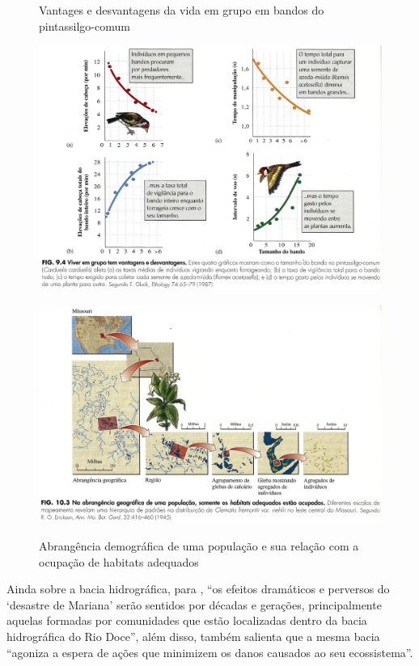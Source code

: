 \documentclass[
article,			%
11pt,				%
oneside,			%
a4paper,			%
english,			%
brazil,				%
sumario=tradicional
]{abntex2}
\begin{document}
	\begin{figure}
		\centering
		\caption{Vantages e desvantagens da vida em grupo em bandos do pintassilgo-comum}
		\includegraphics[width=1.0\linewidth]{img/rick_180_01.png}
		\label{fig:grupos}
		
		\caption{Abrangência demográfica de uma população e sua relação com a ocupação de habitats adequados}
		\includegraphics[width=1.0\linewidth]{img/rick_194_01.png}
		\label{fig:habitats}
	\end{figure}
	
	Ainda sobre a bacia hidrográfica, para , ``os efeitos dramáticos e perversos do `desastre de Mariana' serão sentidos por décadas e gerações, principalmente aquelas formadas por comunidades que estão localizadas dentro da bacia hidrográfica do Rio Doce'', além disso,  também salienta que a mesma bacia ``agoniza a espera de ações que minimizem os danos causados ao seu ecossistema''.
	
\end{document}
